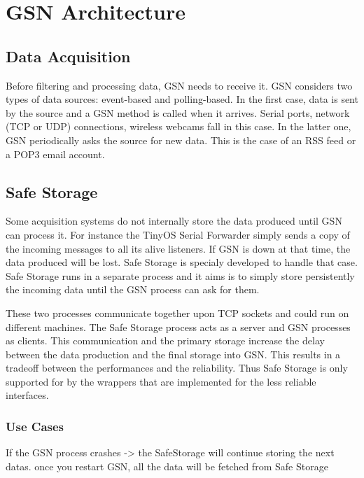 \graphicspath{{chapters/ch-architecture/figures/}}

\chapter{GSN Architecture}

\section{Data Acquisition}

 Before filtering and processing data, GSN needs to receive it. GSN considers two types of data sources: event-based and polling-based.
 In the first case, data is sent by the source and a GSN method is called when it arrives.
 Serial ports, network (TCP or UDP) connections, wireless webcams fall in this case. In the latter one, GSN periodically asks the 
 source for new data. This is the case of an RSS feed or a POP3 email account.

\section{Safe Storage}

Some acquisition systems do not internally store the data produced until GSN can process it. For instance 
the TinyOS Serial Forwarder simply sends a copy of the incoming messages to all its alive listeners. If GSN is down 
at that time, the data produced will be lost. Safe Storage is specialy developed to handle that case.
Safe Storage runs in a separate process and it aims is to simply store persistently the incoming data until the GSN process can ask for them.

These two processes communicate together upon TCP sockets and could run on different machines. The Safe Storage process acts as 
a server and GSN processes as clients. This communication and the primary storage increase the delay between the data production and the 
final storage into GSN. This results in a tradeoff between the performances and the reliability. Thus Safe Storage is only supported for by the wrappers
that are implemented for the less reliable interfaces.

\subsection{Use Cases}

If the GSN process crashes -> the SafeStorage will continue storing the next datas.
once you restart GSN, all the data will be fetched from Safe Storage

